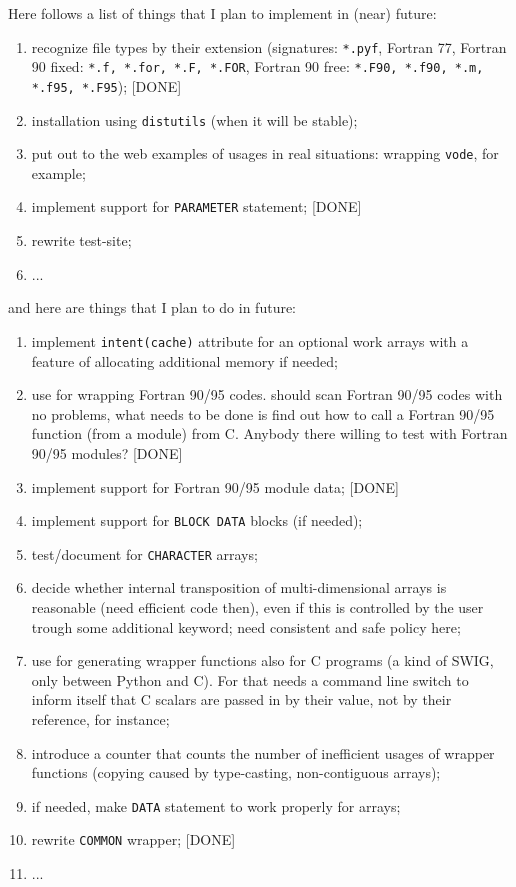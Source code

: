 Here follows a list of things that I plan to implement in (near) future:
\begin{enumerate}
\item recognize file types by their extension (signatures:
  \texttt{*.pyf}, Fortran 77, Fortran 90 fixed: \texttt{*.f, *.for, *.F, *.FOR},
  Fortran 90 free: \texttt{*.F90, *.f90, *.m, *.f95, *.F95}); [DONE]
\item installation using \texttt{distutils} (when it will be stable);
\item put out to the web examples of \fpy usages in real situations:
  wrapping \texttt{vode}, for example;
\item implement support for \texttt{PARAMETER} statement; [DONE]
\item rewrite test-site;
\item ...
\end{enumerate}
and here are things that I plan to do in future:
\begin{enumerate}
\item implement \texttt{intent(cache)} attribute for an optional work
  arrays with a feature of allocating additional memory if needed;
\item use \fpy for wrapping Fortran 90/95 codes. \fpy should scan
  Fortran 90/95 codes with no problems, what needs to be done is find
  out how to call a Fortran 90/95 function (from a module) from
  C. Anybody there willing to test \fpy with Fortran 90/95 modules? [DONE]
\item implement support for Fortran 90/95 module data; [DONE]
\item implement support for \texttt{BLOCK DATA} blocks (if needed);
\item test/document \fpy for \texttt{CHARACTER} arrays;
\item decide whether internal transposition of multi-dimensional
  arrays is reasonable (need efficient code then), even if this is
  controlled by the user trough some additional keyword; need
  consistent and safe policy here;
\item use \fpy for generating wrapper functions also for C programs (a
  kind of SWIG, only between Python and C). For that \fpy needs a
  command line switch to inform itself that C scalars are passed in by
  their value, not by their reference, for instance;
\item introduce a counter that counts the number of inefficient usages
  of wrapper functions (copying caused by type-casting, non-contiguous
  arrays);
\item if needed, make \texttt{DATA} statement to work properly for
  arrays;
\item rewrite \texttt{COMMON} wrapper; [DONE]
\item ...
\end{enumerate}
